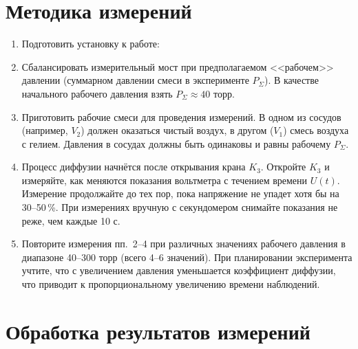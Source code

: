 \documentclass[a4paper]{article}
\begin{document}
	
	\section{Методика измерений}
	\begin{enumerate}
		
		\item Подготовить установку к работе:
		
		\item Сбалансировать измерительный мост при предполагаемом <<рабочем>> давлении (суммарном давлении смеси в эксперименте $P_\Sigma$). В качестве начального рабочего давления взять $P_\Sigma \approx 40$ торр.
		
		\item Приготовить рабочие смеси для проведения измерений. В одном из сосудов (например, $V_2$) должен оказаться чистый воздух, в другом ($V_1$) смесь воздуха с гелием. Давления в сосудах должны быть одинаковы и равны рабочему $P_\Sigma$.
		
		\item Процесс диффузии начнётся после открывания крана $K_3$. Откройте $K_3$ и измеряйте, как меняются показания вольтметра с течением времени $U(t)$. Измерение продолжайте до тех пор, пока напряжение не упадет хотя бы на 30–50\,\%. При измерениях вручную с секундомером снимайте показания не реже, чем каждые 10 с.
		
		\item Повторите измерения пп.~2–4 при различных значениях рабочего давления в диапазоне 40–300 торр (всего 4–6 значений). При планировании эксперимента учтите, что с увеличением давления уменьшается коэффициент диффузии, что приводит к пропорциональному увеличению времени наблюдений.

	\end{enumerate}
	
	\section*{Обработка результатов измерений}
	
\end{document}
